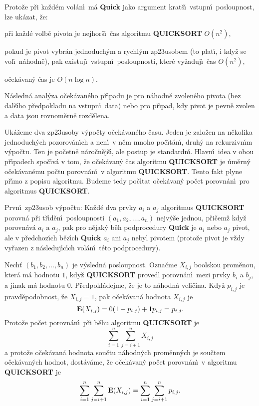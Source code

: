 \flushpar Proto\v ze p\v ri ka\v zd\'em vol\'an\'\i\ m\'a {\bf Quick} jako 
argument krat\v s\'\i\ 
vstupn\'\i\ posloupnost, lze uk\'azat, \v ze:
\roster
\item{}p\v ri ka\v zd\'e volb\v e 
pivota je nejhor\v s\'\i\ \v cas algoritmu {\bf QUICKSORT} $O(n^2
)$,
\item{}pokud je pivot vybr\'an jedno\-du\-ch\'ym a rychl\'ym 
zp\accent23usobem (to plat\'\i , i kdy\v z se vol\'\i\ n\'ahodn\v e), pak 
exi\-stuj\'\i\ vstupn\'\i\ posloupnosti, kter\'e vy\v zaduj\'\i\ \v cas $
O(n^2)$,
\item{}o\v cek\'avan\'y \v cas je $O(n\log n)$.
\endroster
\medskip

\flushpar N\'asledn\'a anal\'y\-za o\v cek\'avan\'eho p\v r\'\i padu  
je pro n\'a\-hod\-n\v e zvolen\'eho pivota (bez dal\v s\'\i ho p\v red\-pokladu na 
vstupn\'\i\ data) nebo pro p\v r\'\i pad, kdy pivot je pevn\v e zvolen a data jsou 
rovno\-m\v ern\v e rozd\v e\-lena.
\medskip

\flushpar Uk\'a\v zeme dva zp\accent23usoby v\'ypo\v cty o\v cek\'avan\'eho \v casu.  Jeden 
je zalo\v zen na n\v ekolika jednoduch\'ych pozorov\'an\'\i ch a nen\'\i\ v 
n\v em mnoho po\v c\'\i t\'an\'\i , druh\'y na rekurzivn\'\i m v\'ypo\v ctu. Ten 
je po\v cetn\v e n\'aro\v cn\v ej\v s\'\i , ale postup je standardn\'\i . Hlavn\'\i\ idea v obou 
p\v r\'\i padech spo\v c\'\i v\'a v tom, \v ze  
o\v cek\'avan\'y \v cas algoritmu {\bf QUICKSORT} je \'um\v ern\'y 
o\v cek\'avan\'emu po\v ctu porovn\'an\'\i\ v algoritmu {\bf QUICKSORT}.
Tento fakt plyne p\v r\'\i mo z popisu algoritmu.  Budeme 
tedy po\v c\'\i tat  
o\v cek\'a\-van\'y po\v cet porovn\'an\'\i\ pro algoritmus {\bf QUICKSORT}.  
\medskip

\flushpar Prvn\'\i\ zp\accent23usob v\'ypo\v ctu:\newline 
Ka\v zd\'e dva prvky $a_i$ a $a_j$ algoritmus {\bf QUICKSORT} porovn\'a 
p\v ri t\v r\'\i d\v en\'\i\ posloupnosti $(a_1,a_2,\dots,a_n)$ nejv\'y\v se jednou, 
p\v ri\v cem\v z kdy\v z porovn\'av\'a $a_i$ a $a_j$, 
pak pro n\v ejak\'y b\v eh podprocedury {\bf Quick} je $a_i$ nebo $
a_j$ 
pivot, ale v p\v redchoz\'\i ch b\v ez\'\i ch {\bf Quick} $a_i$ ani $
a_j$ 
nebyl pivotem (proto\v ze pivot je v\v zdy vy\v razen z n\'asleduj\'\i c\'\i ch 
vol\'an\'\i\ t\'eto podprocedury).
\medskip

\flushpar Nech\v t $(b_1,b_2,\dots,b_n)$ je v\'ysledn\'a posloupnost.  
Ozna\v cme $X_{i,j}$ boolskou prom\v enou, kter\'a m\'a hodnotu $
1$, 
kdy\v z {\bf QUICKSORT} provedl porovn\'an\'\i\ mezi prvky $b_i$ a $
b_j$, a 
jinak m\'a hodnotu $0$.  P\v redpokl\'adejme, \v ze je to n\'ahodn\'a 
veli\v cina. Kdy\v z $p_{i,j}$ je prav\-d\v e\-podobnost, \v ze $
X_{i,j}=1$, 
pak o\v cek\'avan\'a hodnota $X_{i,j}$ je 
$$\bold E(X_{i,j})=0(1-p_{i,j})+1p_{i,j}=p_{i,j}.$$
Proto\v ze po\v cet porovn\'an\'\i\  p\v ri b\v ehu algoritmu {\bf QUICKSORT} je
$$\sum_{i=1}^n\sum_{j=i+1}^nX_{i,j}$$
a proto\v ze o\v cek\'avan\'a hodnota sou\v ctu n\'ahodn\'ych 
prom\v enn\'ych je sou\v ctem o\v cek\'avan\'ych hodnot, dost\'av\'ame, \v ze 
o\v cek\'avan\'y po\v cet porovn\'an\'\i\ v algoritmu {\bf QUICKSORT} je
$$\sum_{i=1}^n\sum_{j=i+1}^n\bold E(X_{i,j})=\sum_{i=1}^n\sum_{j=
i+1}^np_{i,j}.$$
\medskip

